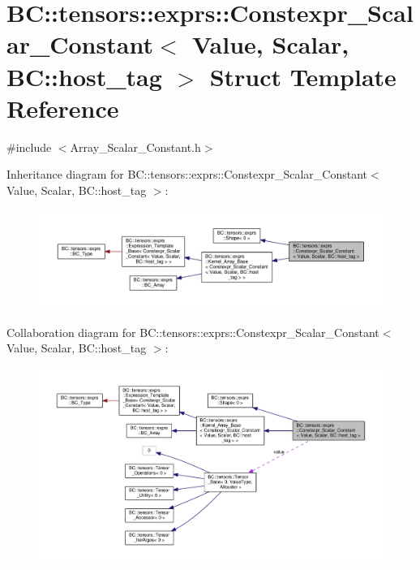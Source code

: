 \hypertarget{structBC_1_1tensors_1_1exprs_1_1Constexpr__Scalar__Constant_3_01Value_00_01Scalar_00_01BC_1_1host__tag_01_4}{}\section{BC\+:\+:tensors\+:\+:exprs\+:\+:Constexpr\+\_\+\+Scalar\+\_\+\+Constant$<$ Value, Scalar, BC\+:\+:host\+\_\+tag $>$ Struct Template Reference}
\label{structBC_1_1tensors_1_1exprs_1_1Constexpr__Scalar__Constant_3_01Value_00_01Scalar_00_01BC_1_1host__tag_01_4}


{\ttfamily \#include $<$Array\+\_\+\+Scalar\+\_\+\+Constant.\+h$>$}



Inheritance diagram for BC\+:\+:tensors\+:\+:exprs\+:\+:Constexpr\+\_\+\+Scalar\+\_\+\+Constant$<$ Value, Scalar, BC\+:\+:host\+\_\+tag $>$\+:
\nopagebreak
\begin{figure}[H]
\begin{center}
\leavevmode
\includegraphics[width=350pt]{structBC_1_1tensors_1_1exprs_1_1Constexpr__Scalar__Constant_3_01Value_00_01Scalar_00_01BC_1_1host__tag_01_4__inherit__graph}
\end{center}
\end{figure}


Collaboration diagram for BC\+:\+:tensors\+:\+:exprs\+:\+:Constexpr\+\_\+\+Scalar\+\_\+\+Constant$<$ Value, Scalar, BC\+:\+:host\+\_\+tag $>$\+:
\nopagebreak
\begin{figure}[H]
\begin{center}
\leavevmode
\includegraphics[width=350pt]{structBC_1_1tensors_1_1exprs_1_1Constexpr__Scalar__Constant_3_01Value_00_01Scalar_00_01BC_1_1host__tag_01_4__coll__graph}
\end{center}
\end{figure}
